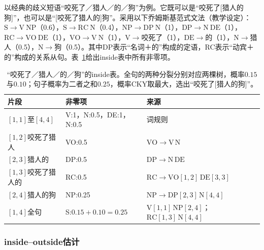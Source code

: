 以经典的歧义短语“咬死了／猎人／的／狗”为例。它既可以是“咬死了[猎人的狗]”，也可以是“[咬死了猎人的]狗”。采用以下乔姆斯基范式文法（教学设定）：$\mathrm S\to\mathrm V\ \mathrm{NP}$（0.6），$\mathrm S\to\mathrm{RC}\ \mathrm N$（0.4），$\mathrm{NP}\to\mathrm{DP}\ \mathrm N$（1），$\mathrm{DP}\to\mathrm N\ \mathrm{DE}$（1），$\mathrm{RC}\to\mathrm{VO}\ \mathrm{DE}$（1），$\mathrm{VO}\to\mathrm V\ \mathrm N$（1），$\mathrm V\to$咬死了（1），$\mathrm{DE}\to$的（1），$\mathrm N\to$猎人（0.5），$\mathrm N\to$狗（0.5）。其中DP表示“名词＋的”构成的定语，RC表示“动宾＋的”构成的关系从句。表~\ref{tab:nlp-classical-cky-chart}给出inside表中所有非零项。

\begin{table}[htbp]
  \centering
  \begin{tabular}{@{}lll@{}}
    \toprule
    片段 & 非零项 & 来源\\
    \midrule
    $[1,1]$至$[4,4]$ & V:1，N:0.5，DE:1，N:0.5 & 词规则\\
    $[1,2]$咬死了猎人 & VO:0.5 & $\mathrm{VO}\to\mathrm V\,\mathrm N$\\
    $[2,3]$猎人的 & DP:0.5 & $\mathrm{DP}\to\mathrm N\,\mathrm{DE}$\\
    $[1,3]$咬死了猎人的 & RC:0.5 & $\mathrm{RC}\to\mathrm{VO}[1,2]\,\mathrm{DE}[3,3]$\\
    $[2,4]$猎人的狗 & NP:0.25 & $\mathrm{NP}\to\mathrm{DP}[2,3]\,\mathrm N[4,4]$\\
    $[1,4]$全句 & S:$0.15+0.10=0.25$ & $\mathrm V[1,1]\,\mathrm{NP}[2,4]$；$\mathrm{RC}[1,3]\,\mathrm N[4,4]$\\
    \bottomrule
  \end{tabular}
  \caption{“咬死了／猎人／的／狗”的inside表。全句的两种分裂分别对应两棵树，概率$0.15$与$0.10$；句子概率为二者之和$0.25$，概率CKY取最大，选出“咬死了[猎人的狗]”。}
  \label{tab:nlp-classical-cky-chart}
\end{table}

\subsubsection{inside--outside估计}
\label{sec:nlp-classical-inside-outside}

